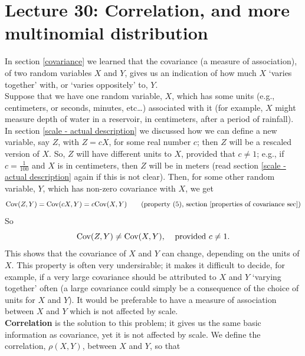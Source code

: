 \chapter{Lecture 30: Correlation, and more multinomial distribution} \label{correlation}
In section \ref{covariance} we learned that the covariance (a measure of association), of two random variables $X$ and $Y$, gives us an indication of how much $X$ `varies together' with, or `varies oppositely' to, $Y$. \\

\noindent Suppose that we have one random variable, $X$, which has some units (e.g., centimeters, or seconds, minutes, etc\ldots) associated with it (for example, $X$ might measure depth of water in a reservoir, in centimeters, after a period of rainfall). In section \ref{scale - actual description} we discussed how we can define a new variable, say $Z$, with $Z = cX$, for some real number $c$; then $Z$ will be a rescaled version of $X.$ So, $Z$ will have different units to $X$, provided that $c \neq 1$; e.g., if $c = \frac{1}{100}$ and $X$ is in centimeters, then $Z$ will be in meters (read section \ref{scale - actual description} again if this is not clear). Then, for some other random variable, $Y$, which has non-zero covariance with $X$, we get
\[
\Cov(Z,Y) = \Cov(cX,Y) = c\Cov(X,Y) \tag{property (5), section \ref{properties of covariance sec}}
\]
So
\[
\text{Cov}(Z,Y) \neq \text{Cov}(X,Y), \;\;\;\; \text{provided $c \neq 1.$}
\]
This shows that the covariance of $X$ and $Y$ can change, depending on the units of $X$. This property is often very undersirable; it makes it difficult to decide, for example, if a very large covariance should be attributed to $X$ and $Y$ `varying together' often (a large covariance could simply be a consequence of the choice of units for $X$ and $Y$). It would be preferable to have a measure of association between $X$ and $Y$ which is not affected by scale. \\

\noindent \textbf{Correlation} is the solution to this problem; it gives us the same basic information as covariance, yet it is not affected by scale. We define the correlation, $\rho(X,Y)$, between $X$ and $Y$, so that

  	\bigskip
	
	\hfil{}
	\bigskip
	

